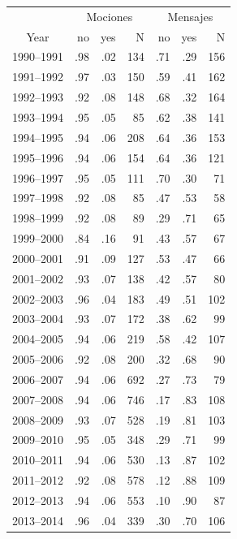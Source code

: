 \documentclass[letter,12pt]{article}
\newcommand{\mc}{\multicolumn}
\begin{document}
\begin{table}
\begin{center}
\begin{tabular}{crrr|rrr}
        & \mc{3}{c}{Mociones} & \mc{3}{c}{Mensajes} \\
Year        &  no & yes &  N  &  no & yes &  N  \\ \hline
1990--1991  & .98 & .02 &134   & .71 & .29& 156 \\
1991--1992  & .97 & .03 &150   & .59 & .41& 162 \\
1992--1993  & .92 & .08 &148   & .68 & .32& 164 \\
1993--1994  & .95 & .05 & 85   & .62 & .38& 141 \\ \hline
1994--1995  & .94 & .06 &208   & .64 & .36& 153 \\
1995--1996  & .94 & .06 &154   & .64 & .36& 121 \\
1996--1997  & .95 & .05 &111   & .70 & .30&  71 \\
1997--1998  & .92 & .08 &85    & .47 & .53& 58  \\ \hline
1998--1999  & .92 & .08 &89    & .29 & .71& 65  \\
1999--2000  & .84 & .16 &91    & .43 & .57& 67  \\
2000--2001  & .91 & .09 &127   & .53 & .47&  66 \\
2001--2002  & .93 & .07 &138   & .42 & .57&  80 \\ \hline
2002--2003  & .96 & .04 &183   & .49 & .51& 102 \\
2003--2004  & .93 & .07 &172   & .38 & .62&  99 \\
2004--2005  & .94 & .06 &219   & .58 & .42& 107 \\
2005--2006  & .92 & .08 &200   & .32 & .68&  90 \\ \hline
2006--2007  & .94 & .06 &692   & .27 & .73&  79 \\
2007--2008  & .94 & .06 &746   & .17 & .83& 108 \\
2008--2009  & .93 & .07 &528   & .19 & .81& 103 \\
2009--2010  & .95 & .05 &348   & .29 & .71&  99 \\ \hline
2010--2011  & .94 & .06 &530   & .13 & .87& 102 \\
2011--2012  & .92 & .08 &578   & .12 & .88& 109 \\
2012--2013  & .94 & .06 &553   & .10 & .90&  87 \\
2013--2014  & .96 & .04 &339   & .30 & .70& 106 \\ \hline \hline

\end{tabular}
\end{center}
\end{table}
\end{document}
